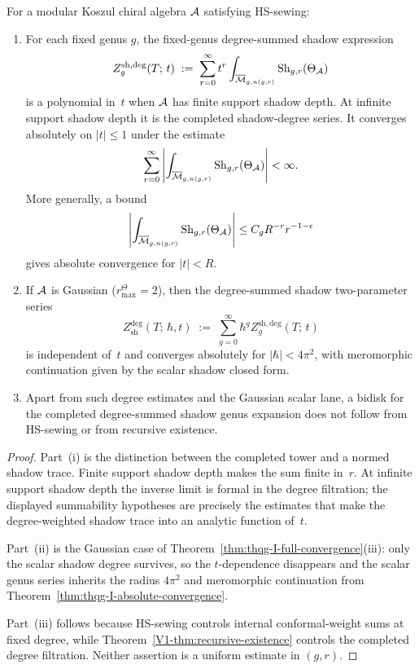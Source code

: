\begin{theorem}
\label{thm:thqg-I-2d-convergence}
For a modular Koszul chiral algebra $\mathcal{A}$ satisfying HS-sewing:
\begin{enumerate}[label=\textup{(\roman*)}]
\item For each fixed genus $g$, the fixed-genus degree-summed shadow
expression
\begin{equation}%
Z_g^{\mathrm{sh,deg}}(T;\,t) \;:=\; \sum_{r=0}^\infty t^r
\int_{\overline{\mathcal{M}}_{g,n(g,r)}} \operatorname{Sh}_{g,r}(\Theta_\cA)
\end{equation}
is a polynomial in~$t$ when $\mathcal{A}$ has finite support shadow depth. At infinite
support shadow depth it is the completed shadow-degree series. It converges
absolutely on $|t|\leq 1$ under the estimate
\[
\sum_{r=0}^\infty
\left|
\int_{\overline{\mathcal{M}}_{g,n(g,r)}}
\operatorname{Sh}_{g,r}(\Theta_{\mathcal{A}})
\right| < \infty .
\]
More generally, a bound
\[
\left|
\int_{\overline{\mathcal{M}}_{g,n(g,r)}}
\operatorname{Sh}_{g,r}(\Theta_{\mathcal{A}})
\right|
\leq C_g R^{-r} r^{-1-\epsilon}
\]
gives absolute convergence for $|t|<R$.
\item If $\mathcal{A}$ is Gaussian \textup{(}\(r^\Theta_{\max}=2\)\textup{)}, then the
degree-summed shadow two-parameter series
\[
Z_{\mathrm{sh}}^{\mathrm{deg}}(T;\,\hbar,t)
\;:=\;
\sum_{g=0}^\infty \hbar^g Z_g^{\mathrm{sh,deg}}(T;\,t)
\]
is independent of~$t$ and converges absolutely for $|\hbar|<4\pi^2$,
with meromorphic continuation given by the scalar shadow closed form.
\item Apart from such degree estimates and the Gaussian scalar lane, a
bidisk for the completed degree-summed shadow genus expansion does not
follow from HS-sewing or from recursive existence.
\end{enumerate}
\end{theorem}

\begin{proof}
Part~(i) is the distinction between the completed tower and a normed
shadow trace. Finite support shadow depth makes the sum finite in~$r$. At
infinite support shadow depth the inverse limit is formal in the degree
filtration; the displayed summability hypotheses are precisely the
estimates that make the degree-weighted shadow trace into an analytic
function of~$t$.

Part~(ii) is the Gaussian case of
Theorem~\ref{thm:thqg-I-full-convergence}\textup{(iii)}: only the scalar
shadow degree survives, so the $t$-dependence disappears and the scalar
genus series inherits the radius $4\pi^2$ and meromorphic continuation
from Theorem~\ref{thm:thqg-I-absolute-convergence}.

Part~(iii) follows because HS-sewing controls internal conformal-weight
sums at fixed degree, while
Theorem~\ref{V1-thm:recursive-existence} controls the completed
degree filtration. Neither assertion is a uniform estimate in
$(g,r)$.
\end{proof}

